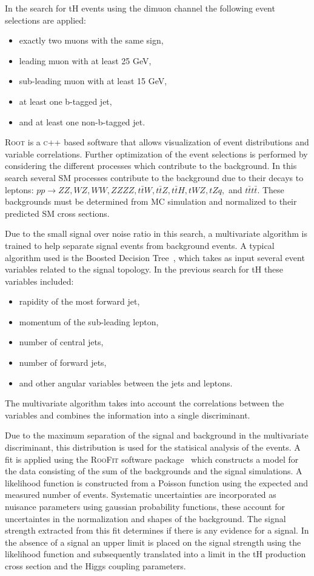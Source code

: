 \documentclass[final,3p]{CSP}
\begin{document}
In the search for tH events using the dimuon channel the following event selections are applied:
\begin{itemize}
\item exactly two muons with the same sign,
\item leading muon with at least 25 GeV,
\item sub-leading muon with at least 15 GeV,
\item at least one b-tagged jet,
  \item and at least one non-b-tagged jet.
\end{itemize}


\textsc{Root} is a \textsc{c++} based software that allows visualization of event distributions and variable correlations.
Further optimization of the event selections is performed by considering the different processes which contribute to the background.
In this search several SM processes contribute to the background due to their decays to leptons: $pp\rightarrow ZZ, WZ, WW, ZZZZ, t\bar{t}W, t\bar{t}Z, t\bar{t}H, tWZ, tZq,$ and $t\bar{t}t\bar{t}$.
These backgrounds must be determined from MC simulation and normalized to their predicted SM cross sections. 

Due to the small signal over noise ratio in this search, a multivariate algorithm is trained to help separate signal events from background events.
A typical algorithm used is the Boosted Decision Tree~\cite{hoecker2007tmva}, which takes as input several event variables related to the signal topology.
In the previous search for tH these variables included:
\begin{itemize}
\item rapidity of the most forward jet,
\item momentum of the sub-leading lepton,
\item number of central jets,
\item number of forward jets,
\item and other angular variables between the jets and leptons.
\end{itemize}
The multivariate algorithm takes into account the correlations between the variables and combines the information into a single discriminant.

Due to the maximum separation of the signal and background in the multivariate discriminant, this distribution is used for the statisical analysis of the events.
A fit is applied using the \textsc{RooFit} software package~\cite{verkerke2008roofit} which constructs a model for the data consisting of the sum of the backgrounds and the signal simulations. A likelihood function is constructed from a Poisson function using the expected and measured number of events.
Systematic uncertainties are incorporated as nuisance parameters using gaussian probability functions, these account for uncertaintes in the normalization and shapes of the background.
The signal strength extracted from this fit determines if there is any evidence for a signal.
In the absence of a signal an upper limit is placed on the signal strength using the likelihood function and subsequently translated into a limit in the tH production cross section and the Higgs coupling parameters. 
\end{document}
